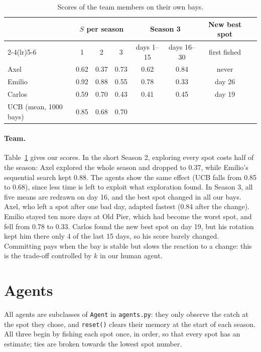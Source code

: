 \documentclass[11pt,a4paper]{article}
\begin{document}
\begin{table}[t]
\centering
\small
\begin{tabular}{lccccccc}
\toprule
 & \multicolumn{3}{c}{$S$ per season} & \multicolumn{2}{c}{Season 3}
 & New best spot \\
\cmidrule(lr){2-4}\cmidrule(lr){5-6}
 & 1 & 2 & 3 & days 1--15 & days 16--30 & first fished \\
\midrule
Axel   & 0.62 & 0.37 & 0.73 & 0.62 & 0.84 & never \\
Emilio & 0.92 & 0.88 & 0.55 & 0.78 & 0.33 & day 26 \\
Carlos & 0.59 & 0.70 & 0.43 & 0.41 & 0.45 & day 19 \\
\midrule
UCB (mean, 1000 bays) & 0.85 & 0.68 & 0.70 & & & \\
\bottomrule
\end{tabular}
\caption{Scores of the team members on their own bays.}
\label{tab:team}
\end{table}

\paragraph{Team.} Table~\ref{tab:team} gives our scores. In the short Season 2,
exploring every spot costs half of the season: Axel explored the whole season and
dropped to 0.37, while Emilio's sequential search kept 0.88. The agents show the
same effect (UCB falls from 0.85 to 0.68), since less time is left to exploit
what exploration found. In Season 3, all five means are redrawn on day 16, and
the best spot changed in all our bays. Axel, who left a spot after one bad day,
adapted fastest (0.84 after the change). Emilio stayed ten more days at Old
Pier, which had become the worst spot, and fell from 0.78 to 0.33. Carlos found
the new best spot on day 19, but his rotation kept him there only 4 of the last
15 days, so his score barely changed. Committing pays when the bay is stable but
slows the reaction to a change: this is the trade-off controlled by $k$ in our
human agent.

\section{Agents}
\label{sec:agents}

All agents are subclasses of \texttt{Agent} in \texttt{agents.py}: they only
observe the catch at the spot they chose, and \texttt{reset()} clears their
memory at the start of each season. All three begin by fishing each spot once,
in order, so that every spot has an estimate; ties are broken towards the lowest
spot number.
\end{document}
